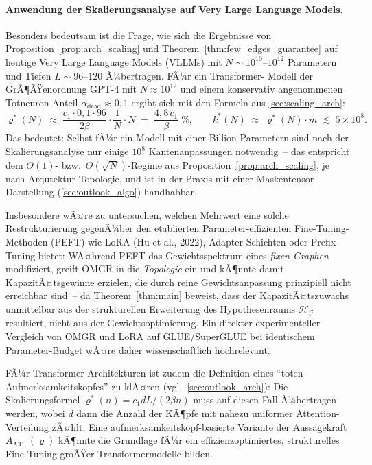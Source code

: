﻿\documentclass[12pt, a4paper, openany]{report}
\newcommand{\calG}{\mathcal{G}}
\newcommand{\calH}{\mathcal{H}}
\begin{document}
\paragraph{Anwendung der Skalierungsanalyse auf Very Large Language Models.}
Besonders bedeutsam ist die Frage, wie sich die Ergebnisse von
Proposition~\ref{prop:arch_scaling} und Theorem~\ref{thm:few_edges_guarantee}
auf heutige Very Large Language Models (VLLMs) mit $N \sim 10^{10}$--$10^{12}$
Parametern und Tiefen $L \sim 96$--$120$ Ã¼bertragen.  FÃ¼r ein Transformer-
Modell der GrÃ¶ÃŸenordnung GPT-4 mit $N \approx 10^{12}$ und einem konservativ
angenommenen Totneuron-Anteil $\alpha_{\mathrm{dead}} \approx 0{,}1$ ergibt
sich mit den Formeln aus \cref{sec:scaling_arch}:
\[
  \varrho^*(N)
  \;\approx\; \frac{c_1 \cdot 0{,}1 \cdot 96}{2\beta}
  \cdot \frac{1}{N} \cdot N
  \;=\; \frac{4{,}8\,c_1}{\beta}\;\%,
  \qquad
  k^*(N) \;\approx\; \varrho^*(N)\cdot m \;\lesssim\; 5 \times 10^{8}.
\]
Das bedeutet: Selbst fÃ¼r ein Modell mit einer Billion Parametern sind nach
der Skalierungsanalyse nur einige $10^8$ Kanten\-anpassungen notwendig~--
das entspricht dem $\Theta(1)$- bzw.\ $\Theta(\sqrt{N})$-Regime aus
Proposition~\ref{prop:arch_scaling}, je nach Arqutektur-Topologie, und ist
in der Praxis mit einer Masken\-tensor-Darstellung (\cref{sec:outlook_algo})
handhabbar.

Insbesondere wÃ¤re zu untersuchen, welchen Mehrwert eine solche Restrukturierung
gegenÃ¼ber den etablierten Parameter-effizienten Fine-Tuning-Methoden (PEFT)
wie LoRA (Hu et al., 2022), Adapter-Schichten oder Prefix-Tuning bietet:
WÃ¤hrend PEFT das Gewichtsspektrum eines \emph{fixen Graphen} modifiziert,
greift OMGR in die \emph{Topologie} ein und kÃ¶nnte damit KapazitÃ¤tsgewinne
erzielen, die durch reine Gewichts\-anpassung prinzipiell nicht erreichbar
sind~-- da Theorem~\ref{thm:main} beweist, dass der KapazitÃ¤tszuwachs
unmittelbar aus der strukturellen Erweiterung des Hypothesenraums
$\calH_{\calG}$ resultiert, nicht aus der Gewichtsoptimierung.  Ein
direkter experimenteller Vergleich von OMGR und LoRA auf GLUE/SuperGLUE
bei identischem Parameter-Budget wÃ¤re daher wissenschaftlich hochrelevant.

FÃ¼r Transformer-Architekturen ist zudem die Definition eines ``toten
Aufmerksamkeitskopfes'' zu klÃ¤ren (vgl.\ \cref{sec:outlook_arch}): Die
Skalierungsformel $\varrho^*(n) = c_1 dL / (2\beta n)$ muss auf diesen
Fall Ã¼bertragen werden, wobei $d$ dann die Anzahl der KÃ¶pfe mit nahezu
uniformer Attention-Verteilung zÃ¤hlt.  Eine aufmerksamkeitskopf-basierte
Variante der Aussagekraft $A_{\mathrm{ATT}}(\varrho)$ kÃ¶nnte die
Grundlage fÃ¼r ein effizienzoptimiertes, strukturelles Fine-Tuning groÃŸer
Transformermodelle bilden.
\end{document}

